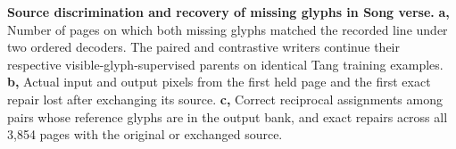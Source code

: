 \textbf{Source discrimination and recovery of missing glyphs in Song verse.} \textbf{a,} Number of pages on which both missing glyphs matched the recorded line under two ordered decoders. The paired and contrastive writers continue their respective visible-glyph-supervised parents on identical Tang training examples. \textbf{b,} Actual input and output pixels from the first held page and the first exact repair lost after exchanging its source. \textbf{c,} Correct reciprocal assignments among pairs whose reference glyphs are in the output bank, and exact repairs across all 3,854 pages with the original or exchanged source.
